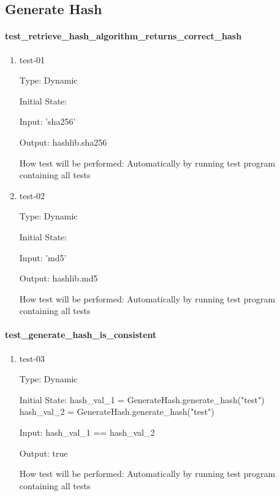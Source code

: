 \documentclass[12pt, titlepage]{article}
\begin{document}
\subsection{Generate Hash}

\paragraph{test\_retrieve\_hash\_algorithm\_returns\_correct\_hash}

\begin{enumerate}

\item{test-01\\}

Type: Dynamic

Initial State:

Input: 'sha256'

Output: hashlib.sha256

How test will be performed: Automatically by running test program containing all tests

\item{test-02\\}

Type: Dynamic

Initial State:

Input: 'md5'

Output: hashlib.md5

How test will be performed: Automatically by running test program containing all tests

\end{enumerate}



\paragraph{test\_generate\_hash\_is\_consistent}

\begin{enumerate}

\item{test-03\\}

Type: Dynamic

Initial State: hash\_val\_1 = GenerateHash.generate\_hash("test") \\
               hash\_val\_2 = GenerateHash.generate\_hash("test")

Input: hash\_val\_1 == hash\_val\_2

Output: true

How test will be performed: Automatically by running test program containing all tests

\end{enumerate}
\end{document}
